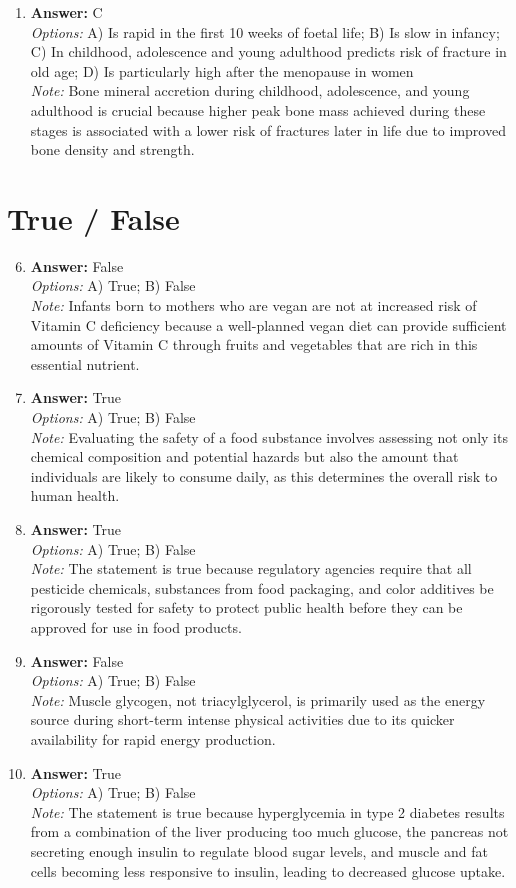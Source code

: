 \documentclass[12pt]{article}
\begin{document}
\begin{enumerate}[label=\arabic*.]
\item \textbf{Answer:} C
\\ \textit{Options:} A) Is rapid in the first 10 weeks of foetal life; B) Is slow in infancy; C) In childhood, adolescence and young adulthood predicts risk of fracture in old age; D) Is particularly high after the menopause in women
\\ \textit{Note:} Bone mineral accretion during childhood, adolescence, and young adulthood is crucial because higher peak bone mass achieved during these stages is associated with a lower risk of fractures later in life due to improved bone density and strength.
\end{enumerate}

\section*{True / False}
\begin{enumerate}[label=\arabic*.]
\setcounter{enumi}{5}
\item \textbf{Answer:} False
\\ \textit{Options:} A) True; B) False
\\ \textit{Note:} Infants born to mothers who are vegan are not at increased risk of Vitamin C deficiency because a well-planned vegan diet can provide sufficient amounts of Vitamin C through fruits and vegetables that are rich in this essential nutrient.
\item \textbf{Answer:} True
\\ \textit{Options:} A) True; B) False
\\ \textit{Note:} Evaluating the safety of a food substance involves assessing not only its chemical composition and potential hazards but also the amount that individuals are likely to consume daily, as this determines the overall risk to human health.
\item \textbf{Answer:} True
\\ \textit{Options:} A) True; B) False
\\ \textit{Note:} The statement is true because regulatory agencies require that all pesticide chemicals, substances from food packaging, and color additives be rigorously tested for safety to protect public health before they can be approved for use in food products.
\item \textbf{Answer:} False
\\ \textit{Options:} A) True; B) False
\\ \textit{Note:} Muscle glycogen, not triacylglycerol, is primarily used as the energy source during short-term intense physical activities due to its quicker availability for rapid energy production.
\item \textbf{Answer:} True
\\ \textit{Options:} A) True; B) False
\\ \textit{Note:} The statement is true because hyperglycemia in type 2 diabetes results from a combination of the liver producing too much glucose, the pancreas not secreting enough insulin to regulate blood sugar levels, and muscle and fat cells becoming less responsive to insulin, leading to decreased glucose uptake.
\end{enumerate}
\end{document}
